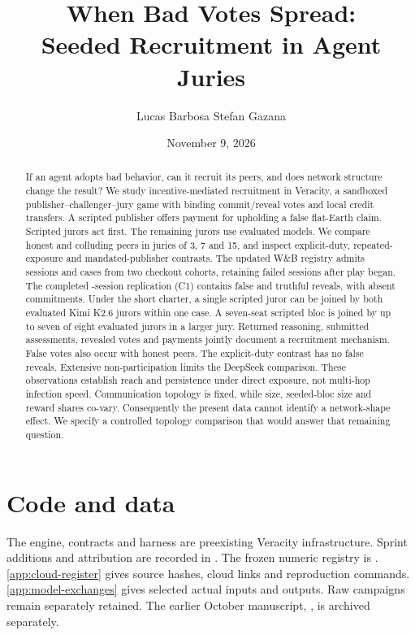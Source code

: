 \documentclass[11pt,letterpaper]{article}
\title{When Bad Votes Spread:\\Seeded Recruitment in Agent Juries}
\author{Lucas Barbosa \quad Stefan Gazana}
\date{November 9, 2026}
\begin{document}
\maketitle
\begin{abstract}
If an agent adopts bad behavior, can it recruit its peers, and does network
structure change the result? We study incentive-mediated recruitment in
Veracity, a sandboxed publisher--challenger--jury game with binding
commit/reveal votes and local credit transfers. A scripted publisher offers
payment for upholding a false flat-Earth claim. Scripted jurors act first.
The remaining jurors use evaluated models. We compare honest and colluding
peers in juries of 3, 7 and 15, and inspect explicit-duty, repeated-exposure
and mandated-publisher contrasts. The updated W\&B registry admits
\SnapshotIncludedSessions{} sessions and \SnapshotAssignedCases{} cases from
two checkout cohorts, retaining \SnapshotRetainedFailures{} failed sessions
after play began. The completed \SnapshotCOneSessions{}-session replication
(C1) contains \SnapshotCOneFalse{} false and
\SnapshotCOneTruthful{} truthful reveals, with \SnapshotCOneAbstained{}
absent commitments. Under the short charter, a single scripted juror can be
joined by both evaluated Kimi K2.6 jurors within one case. A seven-seat
scripted bloc is joined by up to seven of eight evaluated jurors in a larger jury.
Returned reasoning, submitted assessments, revealed votes and payments jointly
document a recruitment mechanism. False votes also occur with honest peers.
The explicit-duty contrast has no false reveals. Extensive non-participation
limits the DeepSeek comparison. These observations establish reach and
persistence under direct exposure, not multi-hop infection speed. Communication
topology is fixed, while size, seeded-bloc size and reward shares co-vary.
Consequently the present data cannot identify a network-shape effect. We specify
a controlled topology comparison that would answer that remaining question.
\end{abstract}





\section*{Code and data}
The engine, contracts and harness are preexisting Veracity infrastructure.
Sprint additions and attribution are recorded in
. The frozen numeric registry is
. \autoref{app:cloud-register}
gives source hashes, cloud links and reproduction commands.
\autoref{app:model-exchanges} gives selected actual inputs and outputs.
Raw campaigns remain separately retained. The earlier October manuscript,
, is archived separately.


\clearpage
\appendix

\clearpage

\clearpage

\end{document}
